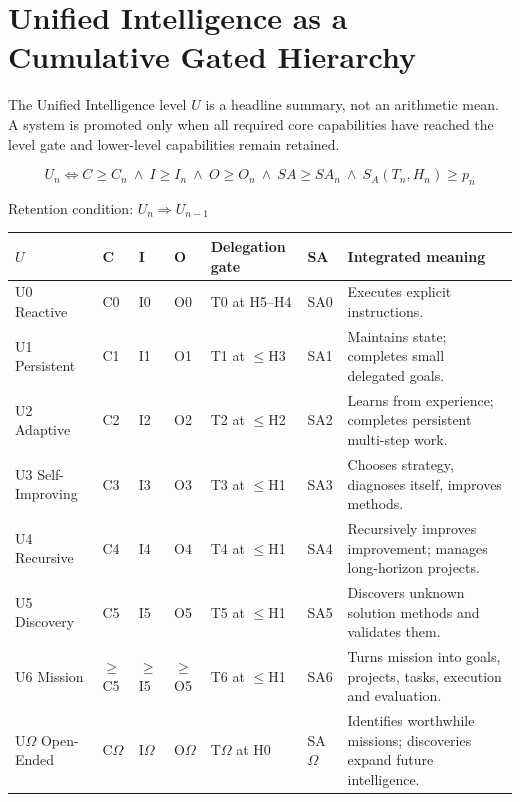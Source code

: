 \documentclass[11pt]{article}
\theoremstyle{definition}
\newcommand{\Om}{\ensuremath{\Omega}}
\begin{document}
\section{Unified Intelligence as a Cumulative Gated Hierarchy}

The Unified Intelligence level $U$ is a headline summary, not an arithmetic mean. A system is promoted only when all required core capabilities have reached the level gate and lower-level capabilities remain retained.

\begin{equation}
U_n \iff C \ge C_n \ \wedge\ I \ge I_n \ \wedge\ O \ge O_n \ \wedge\ SA \ge SA_n \ \wedge\ S_A(T_n,H_n) \ge p_n
\end{equation}
\begin{center}Retention condition: $U_n \Rightarrow U_{n-1}$\end{center}

\begin{table}[h]
\centering\small
\begin{tabularx}{\textwidth}{@{}llllllY@{}}
\toprule
$U$ & C & I & O & Delegation gate & SA & Integrated meaning \\
\midrule
U0 Reactive & C0 & I0 & O0 & T0 at H5--H4 & SA0 & Executes explicit instructions. \\
U1 Persistent & C1 & I1 & O1 & T1 at $\le$H3 & SA1 & Maintains state; completes small delegated goals. \\
U2 Adaptive & C2 & I2 & O2 & T2 at $\le$H2 & SA2 & Learns from experience; completes persistent multi-step work. \\
U3 Self-Improving & C3 & I3 & O3 & T3 at $\le$H1 & SA3 & Chooses strategy, diagnoses itself, improves methods. \\
U4 Recursive & C4 & I4 & O4 & T4 at $\le$H1 & SA4 & Recursively improves improvement; manages long-horizon projects. \\
U5 Discovery & C5 & I5 & O5 & T5 at $\le$H1 & SA5 & Discovers unknown solution methods and validates them. \\
U6 Mission & $\ge$C5 & $\ge$I5 & $\ge$O5 & T6 at $\le$H1 & SA6 & Turns mission into goals, projects, tasks, execution and evaluation. \\
U\Om{} Open-Ended & C\Om{} & I\Om{} & O\Om{} & T\Om{} at H0 & SA\Om{} & Identifies worthwhile missions; discoveries expand future intelligence. \\
\bottomrule
\end{tabularx}
\end{table}
\end{document}
